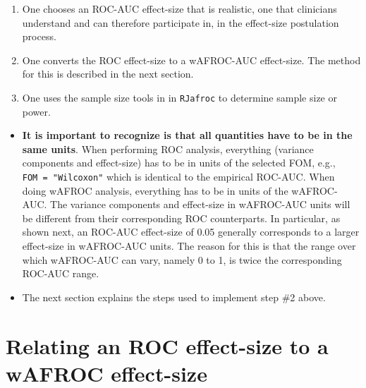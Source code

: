 \documentclass[
]{book}
\providecommand{\tightlist}{%
  \setlength{\itemsep}{0pt}\setlength{\parskip}{0pt}}
\begin{document}
\begin{enumerate}
\def\labelenumi{\arabic{enumi}.}
\tightlist
\item
  One chooses an ROC-AUC effect-size that is realistic, one that clinicians understand and can therefore participate in, in the effect-size postulation process.
\item
  One converts the ROC effect-size to a wAFROC-AUC effect-size. The method for this is described in the next section.
\item
  One uses the sample size tools in in \texttt{RJafroc} to determine sample size or power.
\end{enumerate}

\begin{itemize}
\item
  \textbf{It is important to recognize is that all quantities have to be in the same units}. When performing ROC analysis, everything (variance components and effect-size) has to be in units of the selected FOM, e.g., \texttt{FOM\ =\ "Wilcoxon"} which is identical to the empirical ROC-AUC. When doing wAFROC analysis, everything has to be in units of the wAFROC-AUC. The variance components and effect-size in wAFROC-AUC units will be different from their corresponding ROC counterparts. In particular, as shown next, an ROC-AUC effect-size of 0.05 generally corresponds to a larger effect-size in wAFROC-AUC units. The reason for this is that the range over which wAFROC-AUC can vary, namely 0 to 1, is twice the corresponding ROC-AUC range.
\item
  The next section explains the steps used to implement step \#2 above.
\end{itemize}

\hypertarget{relating-an-roc-effect-size-to-a-wafroc-effect-size}{%
\section{Relating an ROC effect-size to a wAFROC effect-size}\label{relating-an-roc-effect-size-to-a-wafroc-effect-size}}
\end{document}
